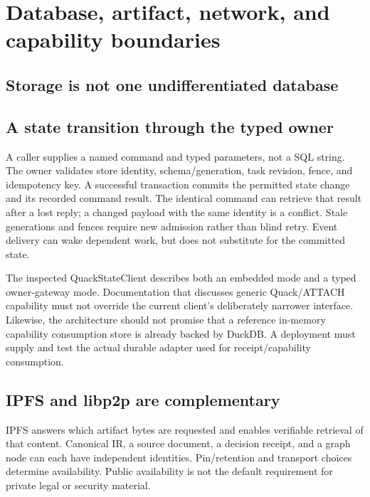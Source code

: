 \documentclass{article}
\begin{document}
\section{Database, artifact, network, and capability boundaries}

\subsection{Storage is not one undifferentiated database}


\subsection{A state transition through the typed owner}

A caller supplies a named command and typed parameters, not a SQL string. The owner validates store identity, schema/generation, task revision, fence, and idempotency key. A successful transaction commits the permitted state change and its recorded command result. The identical command can retrieve that result after a lost reply; a changed payload with the same identity is a conflict. Stale generations and fences require new admission rather than blind retry. Event delivery can wake dependent work, but does not substitute for the committed state.

The inspected QuackStateClient describes both an embedded mode and a typed owner-gateway mode. Documentation that discusses generic Quack/ATTACH capability must not override the current client's deliberately narrower interface. Likewise, the architecture should not promise that a reference in-memory capability consumption store is already backed by DuckDB. A deployment must supply and test the actual durable adapter used for receipt/capability consumption.

\subsection{IPFS and libp2p are complementary}

IPFS answers which artifact bytes are requested and enables verifiable retrieval of that content. Canonical IR, a source document, a decision receipt, and a graph node can each have independent identities. Pin/retention and transport choices determine availability. Public availability is not the default requirement for private legal or security material.
\end{document}
